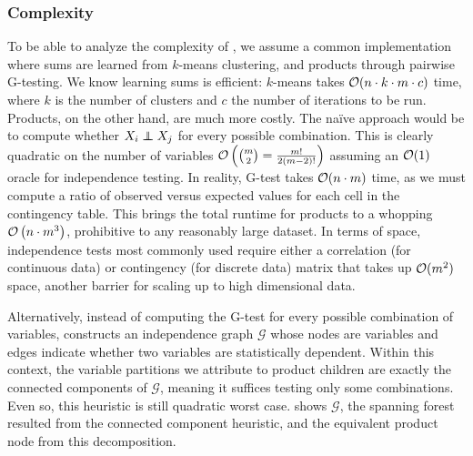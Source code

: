 \subsubsection{Complexity}

To be able to analyze the complexity of , we assume a common implementation
where sums are learned from $k$-means clustering, and products through pairwise G-testing. We know
learning sums is efficient: $k$-means takes $\mathcal{O}(n\cdot k\cdot m\cdot c)$ time, where $k$ is the
number of clusters and $c$ the number of iterations to be run. Products, on the other hand, are
much more costly. The naïve approach would be to compute whether $X_i\indep X_j$ for every possible
combination. This is clearly quadratic on the number of variables
$\mathcal{O}\left(\binom{m}{2}=\frac{m!}{2(m-2)!}\right)$ assuming an $\mathcal{O}(1)$ oracle for independence
testing. In reality, G-test takes $\mathcal{O}(n\cdot m)$ time, as we must compute a ratio of observed
versus expected values for each cell in the contingency table. This brings the total runtime for
products to a whopping $\mathcal{O}\left(n\cdot m^3\right)$, prohibitive to any reasonably large dataset.
In terms of space, independence tests most commonly used require either a correlation (for
continuous data) or contingency (for discrete data) matrix that takes up $\mathcal{O}(m^2)$ space,
another barrier for scaling up to high dimensional data.

Alternatively, instead of computing the G-test for every possible combination of variables,
\citep{gens13} constructs an independence graph $\mathcal{G}$ whose nodes are variables and edges
indicate whether two variables are statistically dependent. Within this context, the variable
partitions we attribute to product children are exactly the connected components of $\mathcal{G}$,
meaning it suffices testing only some combinations. Even so, this heuristic is still quadratic
worst case.  shows $\mathcal{G}$, the spanning forest resulted from the
connected component heuristic, and the equivalent product node from this decomposition.

